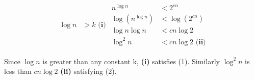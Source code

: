 \documentclass[12pt]{article}
\begin{document}
\begin{enumerate}
\begin{align*}
\begin{split}
                \log n &> k \textbf{ (i)}
            \end{split}
            \begin{split}
                n^{\log n} &< 2^{cn} \\
                \log(n^{\log n}) &< \log(2^{cn}) \\
                \log n \log n &< cn\log 2\\
                \log^2n &< cn\log 2 \textbf{ (ii)}
            \end{split}
        \end{align*}
        \begin{center}
            Since $\log n$ is greater than any constant k, \textbf{(i)} satisfies (1). Similarly $\log^2 n$ is less than $cn \log 2$ \textbf{(ii)} satisfying (2).
        \end{center}
    \end{enumerate}
    \newpage
\end{document}
